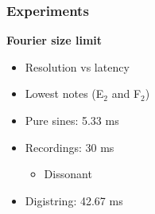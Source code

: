 \documentclass[table]{beamer}
\newcommand{\notee}[2]{#1${}_{#2}$}
\begin{document}


\begin{frame}
\frametitle{Experiments}
    {\large \textbf{Fourier size limit}}
    \begin{itemize}
        \item Resolution vs latency
        \item Lowest notes (\notee{E}{2} and \notee{F}{2})
        \item Pure sines: 5.33 ms
        \item Recordings: 30 ms
        \begin{itemize}
            \item[{\LARGE \rotatebox[origin=c]{180}{$\Lsh$}}] Dissonant
        \end{itemize}
        \item Digistring: 42.67 ms
    \end{itemize}
\end{frame}
\end{document}
